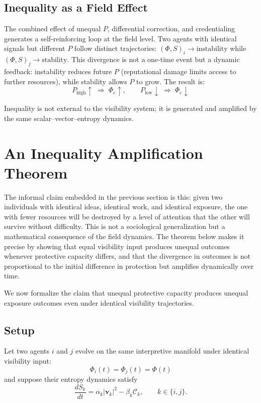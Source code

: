 \documentclass[12pt,a4paper]{article}
\begin{document}
\subsection{Inequality as a Field Effect}

The combined effect of unequal $P$, differential correction, and credentialing generates a self-reinforcing loop at the field level. Two agents with identical signals but different $P$ follow distinct trajectories: $(\Phi,S)_i \rightarrow \text{instability}$ while $(\Phi,S)_j \rightarrow \text{stability}$. This divergence is not a one-time event but a dynamic feedback: instability reduces future $P$ (reputational damage limits access to further resources), while stability allows $P$ to grow. The result is:
\[
P_{\text{high}} \uparrow \;\Rightarrow\; \Phi_{c} \uparrow, \qquad P_{\text{low}} \downarrow \;\Rightarrow\; \Phi_{c} \downarrow
\]

Inequality is not external to the visibility system; it is generated and amplified by the same scalar--vector--entropy dynamics.


\section{An Inequality Amplification Theorem}

The informal claim embedded in the previous section is this: given two individuals with identical ideas, identical work, and identical exposure, the one with fewer resources will be destroyed by a level of attention that the other will survive without difficulty. This is not a sociological generalization but a mathematical consequence of the field dynamics. The theorem below makes it precise by showing that equal visibility input produces unequal outcomes whenever protective capacity differs, and that the divergence in outcomes is not proportional to the initial difference in protection but amplifies dynamically over time.

We now formalize the claim that unequal protective capacity produces unequal exposure outcomes even under identical visibility trajectories.

\subsection{Setup}

Let two agents $i$ and $j$ evolve on the same interpretive manifold under identical visibility input:
\[
\Phi_i(t) = \Phi_j(t) = \Phi(t)
\]
and suppose their entropy dynamics satisfy
\[
\frac{dS_k}{dt} = \alpha_k |\mathbf{v}_k|^2 - \beta_k \mathcal{C}_k,
\qquad k \in \{i,j\}.
\]
\end{document}
